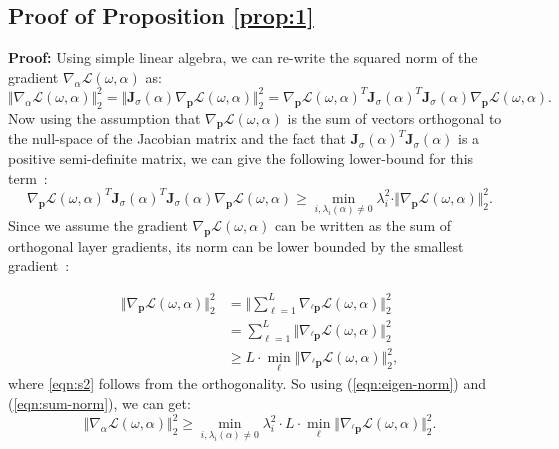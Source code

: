 \documentclass{article} \usepackage{fancyhdr, iclr2023_conference, times}
\def\vp{{\bm{p}}}
\def\mJ{{\bm{J}}}
\begin{document}
 \subsection{Proof of Proposition \ref{prop:1}}
 \label{appndx:proof}
 \textbf{Proof:} Using simple linear algebra, we can re-write the squared norm of the gradient $\nabla_\alpha \mathcal{L}(\omega, \alpha)$ as:
 \begin{equation}
     \Vert \nabla_\alpha \mathcal{L}(\omega, \alpha) \Vert_2^2
     =\Vert \mJ_\sigma (\alpha)\nabla_\vp \mathcal{L}(\omega, \alpha)\Vert_2^2=
     \nabla_\vp \mathcal{L}(\omega, \alpha)^T \mJ_\sigma (\alpha)^T \mJ_\sigma (\alpha) \nabla_\vp \mathcal{L}(\omega, \alpha).
 \end{equation}
 Now using the assumption that $\nabla_\vp \mathcal{L}(\omega, \alpha)$ is the sum of vectors orthogonal to the null-space of the Jacobian matrix and the fact that $\mJ_\sigma (\alpha)^T \mJ_\sigma (\alpha)$ is a positive semi-definite matrix, we can give the following lower-bound for this term~\citep{DBLP:books/siam/Meyer00}:
\begin{equation}
\label{eqn:eigen-norm}
    \nabla_\vp \mathcal{L}(\omega, \alpha)^T \mJ_\sigma (\alpha)^T \mJ_\sigma (\alpha) \nabla_\vp \mathcal{L}(\omega, \alpha)\geq \min_{i, \lambda_i(\alpha)\neq 0} \lambda_i^2 \cdot \Vert \nabla_\vp \mathcal{L}(\omega, \alpha)\Vert_2^2.
\end{equation}
Since we assume the gradient $\nabla_\vp \mathcal{L}(\omega, \alpha)$ can be written as the sum of orthogonal layer gradients, its norm can be lower bounded by the smallest gradient~\citep{DBLP:books/siam/Meyer00}:

\begin{align}
    \Vert \nabla_\vp \mathcal{L}(\omega, \alpha)\Vert_2^2
    &=\Vert\sum_{\ell=1}^L \nabla_{{}^\ell \vp} \mathcal{L}(\omega, \alpha)\Vert_2^2
    \label{eqn:s1}\\
    &=\sum_{\ell=1}^L \Vert\nabla_{{}^\ell \vp} \mathcal{L}(\omega, \alpha)\Vert_2^2
    \label{eqn:s2}\\
    &\geq L \cdot \min_\ell  \Vert\nabla_{{}^\ell \vp} \mathcal{L}(\omega, \alpha)\Vert_2^2,
    \label{eqn:sum-norm}
\end{align}
where \ref{eqn:s2} follows from the orthogonality. So using (\ref{eqn:eigen-norm}) and (\ref{eqn:sum-norm}), we can get:
\begin{equation}
    \Vert \nabla_\alpha \mathcal{L}(\omega, \alpha) \Vert_2^2\geq \min_{i, \lambda_i(\alpha)\neq 0} \lambda_i^2 \cdot L \cdot \min_\ell  \Vert\nabla_{{}^\ell \vp} \mathcal{L}(\omega, \alpha)\Vert_2^2.
\end{equation}
\end{document}
